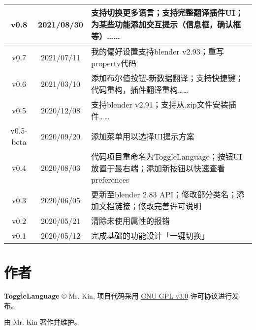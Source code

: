 \documentclass{../../public_resources/doc}
\begin{document}
\begin{longtable}{|*{2}{c|}m{300pt}|}
    \hline
    v0.8 & 2021/08/30 & 支持切换更多语言；支持完整翻译插件UI；为某些功能添加交互提示（信息框，确认框等）…… \\
    \hline
    v0.7 & 2021/07/11 & 我的偏好设置支持blender v2.93；重写property代码 \\
    \hline
    v0.6 & 2021/03/10 & 添加布尔值按钮-新数据翻译；支持快捷键；代码重构，插件翻译重构…… \\
    \hline
    v0.5 & 2020/12/08 & 支持blender v2.91；支持从.zip文件安装插件…… \\
    \hline
    v0.5-beta & 2020/09/20 & 添加菜单用以选择UI提示方案 \\
    \hline
    v0.4 & 2020/08/03 & 代码项目重命名为ToggleLanguage；按钮UI放置于最右端；添加新按钮以快速查看preferences \\
    \hline
    v0.3 & 2020/06/05 & 更新至blender 2.83 API；修改部分类名；添加文档链接；修改完善许可说明 \\
    \hline
    v0.2 & 2020/05/21 & 清除未使用属性的报错 \\
    \hline
    v0.1 & 2020/05/12 & 完成基础的功能设计「一键切换」 \\
    \hline
\end{longtable}


\section{作者}
\textbf{ToggleLanguage} © Mr. Kin, 项目代码采用 \href{https://github.com/Mister-Kin/ToggleLanguage/blob/master/LICENSE}{GNU GPL v3.0} 许可协议进行发布。

由 Mr. Kin 著作并维护。

\appendix
\end{document}
